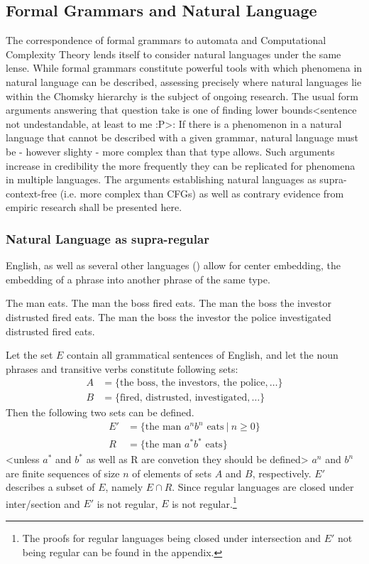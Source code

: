 \subsection{Formal Grammars and Natural Language}
The correspondence of formal grammars to automata and Computational Complexity Theory lends itself to consider natural languages under the same lense. While formal grammars constitute powerful tools with which phenomena in natural language can be described, assessing precisely where natural languages lie within the Chomsky hierarchy is the subject of ongoing research.
The usual form arguments answering that question take is one of finding lower bounds<sentence not undestandable, at least to me :P>: If there is a phenomenon in a natural language that cannot be described with a given grammar, natural language must be - however slighty - more complex than that type allows. Such arguments increase in credibility the more frequently they can be replicated for phenomena in multiple languages. The arguments establishing natural languages as supra-context-free (i.e. more complex than CFGs) as well as contrary evidence from empiric research shall be presented here.

\subsubsection{Natural Language as supra-regular}\label{supraReg}
English, as well as several other languages (\cite{Hagege1976}) allow for center embedding, the embedding of a phrase into another phrase of the same type.
\begin{exe}
	\ex The man eats.
	\ex The man the boss fired eats.
	\ex The man the boss the investor distrusted fired eats.
	\ex The man the boss the investor the police investigated distrusted fired eats.
\end{exe}
Let the set $E$ contain all grammatical sentences of English, and let the noun phrases and transitive verbs constitute following sets:
\begin{align*}
A &= \lbrace \text{the boss}, \, \text{the investors}, \, \text{the police}, \dots \rbrace \\
B &= \lbrace \text{fired}, \, \text{distrusted}, \, \text{investigated}, \dots \rbrace
\end{align*}
Then the following two sets can be defined.
\begin{align*}
E' &= \lbrace \text{the man } a^{n}b^{n} \text{ eats} \: \vert \: n \geq 0 \rbrace \\
R &= \lbrace \text{the man } a^{*}b^{*} \text{ eats} \rbrace
\end{align*}
<unless $a^*$ and $b^*$ as well as R are convetion they should be defined>
$a^{n}$ and $b^{n}$ are finite sequences of size $n$ of elements of sets $A$ and $B$, respectively. $E'$ describes a subset of $E$, namely $E \cap R$. Since regular languages are closed under inter/section and $E'$ is not regular, $E$ is not regular.\footnote{The proofs for regular languages being closed under intersection and $E'$ not being regular can be found in the appendix.}

